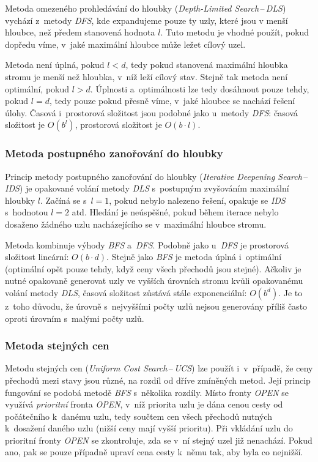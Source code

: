 Metoda omezeného prohledávání do hloubky (\emph{Depth-Limited Search}\,--\,\emph{DLS}) \cite{AI_Russel_Norvig} vychází z~metody \emph{DFS}, kde expandujeme pouze ty uzly, které jsou v menší hloubce, než předem stanovená hodnota $l$. Tuto metodu je vhodné použít, pokud dopředu víme, v~jaké maximální hloubce může ležet cílový uzel.

Metoda není úplná, pokud $l < d$, tedy pokud stanovená maximální hloubka stromu je menší než hloubka, v~níž leží cílový stav. Stejně tak metoda není optimální, pokud $l > d$. Úplnosti a~optimálnosti lze tedy dosáhnout pouze tehdy, pokud $l = d$, tedy pouze pokud přesně víme, v~jaké hloubce se nachází řešení úlohy. Časová i~prostorová složitost jsou podobné jako u~metody \emph{DFS}: časová složitost je $O(b^l)$, prostorová složitost je $O(b \cdot l)$.

\subsubsection*{Metoda postupného zanořování do hloubky}

Princip metody postupného zanořování do hloubky (\emph{Iterative Deepening Search}\,--\,\emph{IDS}) \cite{AI_Russel_Norvig} je opakované volání metody \emph{DLS} s~postupným zvyšováním maximální hloubky $l$. Začíná se s~$l = 1$, pokud nebylo nalezeno řešení, opakuje se \emph{IDS} s~hodnotou $l = 2$ atd. Hledání je neúspěšné, pokud během iterace nebylo dosaženo žádného uzlu nacházejícího se v~maximální hloubce stromu.

Metoda kombinuje výhody \emph{BFS} a~\emph{DFS}. Podobně jako u~\emph{DFS} je prostorová složitost lineární: $O(b \cdot d)$. Stejně jako \emph{BFS} je metoda úplná i~optimální (optimální opět pouze tehdy, když ceny všech přechodů jsou stejné). Ačkoliv je nutné opakovaně generovat uzly ve vyšších úrovních stromu kvůli opakovanému volání metody \emph{DLS}, časová složitost zůstává stále exponenciální: $O(b^d)$. Je to z~toho důvodu, že úrovně s~nejvyššími počty uzlů nejsou generovány příliš často oproti úrovním s~malými počty uzlů.

\subsubsection*{Metoda stejných cen}

Metodu stejných cen (\emph{Uniform Cost Search}\,--\,\emph{UCS}) \cite{AI_Russel_Norvig} lze použít i~v~případě, že ceny přechodů mezi stavy jsou různé, na rozdíl od dříve zmíněných metod. Její princip fungování se podobá metodě \emph{BFS} s~několika rozdíly. Místo fronty \emph{OPEN} se využívá \emph{prioritní} fronta \emph{OPEN}, v~níž priorita uzlu je dána cenou cesty od počátečního k~danému uzlu, tedy součtem cen všech přechodů nutných k~dosažení daného uzlu (nižší ceny mají vyšší prioritu). Při vkládání uzlu do prioritní fronty \emph{OPEN} se zkontroluje, zda se v~ní stejný uzel již nenachází. Pokud ano, pak se pouze případně upraví cena cesty k~němu tak, aby byla co nejnižší.

